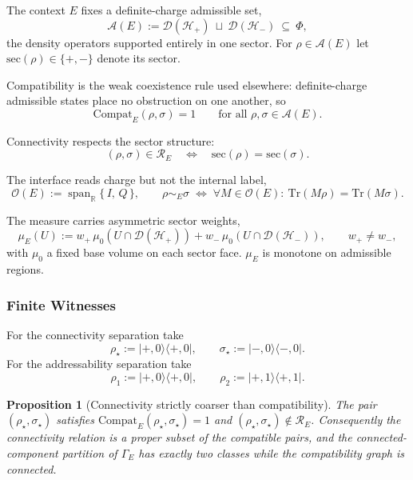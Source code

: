 \documentclass[aps,prx,onecolumn,11pt]{revtex4-2}
\theoremstyle{plain}
\newtheorem{proposition}{Proposition}
\theoremstyle{definition}
\theoremstyle{remark}
\begin{document}
The context \(E\) fixes a definite-charge admissible set,
\[
\mathcal A(E)
:=
\mathcal D(\mathcal H_+)\ \sqcup\ \mathcal D(\mathcal H_-)
\ \subseteq\ \Phi,
\]
the density operators supported entirely in one sector. For
\(\rho\in\mathcal A(E)\) let \(\mathrm{sec}(\rho)\in\{+,-\}\) denote its
sector.

Compatibility is the weak coexistence rule used elsewhere: definite-charge
admissible states place no obstruction on one another, so
\[
\mathrm{Compat}_E(\rho,\sigma)=1
\qquad
\text{for all }\rho,\sigma\in\mathcal A(E).
\]

Connectivity respects the sector structure:
\[
(\rho,\sigma)\in\mathcal R_E
\quad\Longleftrightarrow\quad
\mathrm{sec}(\rho)=\mathrm{sec}(\sigma).
\]

The interface reads charge but not the internal label,
\[
\mathcal O(E):=\operatorname{span}_{\mathbb R}\{\,I,\,Q\,\},
\qquad
\rho\sim_E\sigma
\;\Longleftrightarrow\;
\forall M\in\mathcal O(E):\ \mathrm{Tr}(M\rho)=\mathrm{Tr}(M\sigma).
\]

The measure carries asymmetric sector weights,
\[
\mu_E(U)
:=
w_+\,\mu_0\!\left(U\cap\mathcal D(\mathcal H_+)\right)
+
w_-\,\mu_0\!\left(U\cap\mathcal D(\mathcal H_-)\right),
\qquad
w_+\neq w_-,
\]
with \(\mu_0\) a fixed base volume on each sector face. \(\mu_E\) is
monotone on admissible regions.

\subsubsection{Finite Witnesses}
\label{toy:sector_witness}

For the connectivity separation take
\[
\rho_\star:=\lvert +,0\rangle\langle +,0\rvert,
\qquad
\sigma_\star:=\lvert -,0\rangle\langle -,0\rvert.
\]
For the addressability separation take
\[
\rho_1:=\lvert +,0\rangle\langle +,0\rvert,
\qquad
\rho_2:=\lvert +,1\rangle\langle +,1\rvert.
\]

\begin{proposition}[Connectivity strictly coarser than compatibility]
\label{prop:connectivity_strict}
The pair \((\rho_\star,\sigma_\star)\) satisfies
\(\mathrm{Compat}_E(\rho_\star,\sigma_\star)=1\) and
\((\rho_\star,\sigma_\star)\notin\mathcal R_E\). Consequently the
connectivity relation is a proper subset of the compatible pairs, and
the connected-component partition of \(\Gamma_E\) has exactly two
classes while the compatibility graph is connected.
\end{proposition}
\end{document}
